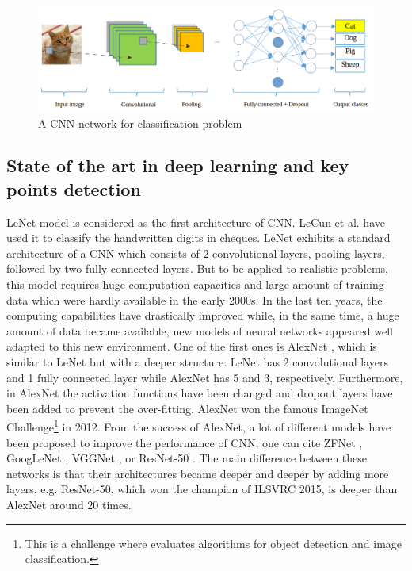 \documentclass[review]{elsarticle}
\begin{document}
\begin{figure}[!h]
	\centering
	\includegraphics[scale=.3]{images/cnn_network_2}
	\caption{A CNN network for classification problem}
	\label{imgcnn_network}
\end{figure}

\subsection{State of the art in deep learning and key points detection}
LeNet \cite{lecun1998gradient} model is considered as the first
architecture of CNN. LeCun et al. \cite{lecun1998gradient} have used
it to classify the handwritten digits in cheques. LeNet exhibits a
standard architecture of a CNN which consists of $2$ convolutional
layers, pooling layers, followed by two fully connected layers. But to
be applied to realistic problems, this model requires huge computation
capacities and large amount of training data which were hardly
available in the early 2000s. In the last ten years, the computing
capabilities have drastically improved while, in the same time, a huge
amount of data became available, new models of neural networks
appeared well adapted to this new environment. One of the first ones
is AlexNet \cite{krizhevsky2012imagenet}, which is similar to LeNet
\cite{lecun1998gradient} but with a deeper structure: LeNet has 2
convolutional layers and 1 fully connected layer while AlexNet has 5
and 3, respectively. Furthermore, in AlexNet the activation functions
have been changed and dropout layers have been added to prevent the
over-fitting. AlexNet won the famous ImageNet Challenge\footnote{This
  is a challenge where evaluates algorithms for object detection and
  image classification.} in 2012. From the success of AlexNet, a lot
of different models have been proposed to improve the performance of
CNN, one can cite ZFNet  \cite{zeiler2014visualizing}, GoogLeNet
\cite{szegedy2015going}, VGGNet \cite{simonyan2014very}, or ResNet-50
\cite{he2016deep}. The main difference between these networks is that
their architectures became deeper and deeper by adding more layers,
e.g. ResNet-50, which won the champion of ILSVRC 2015, is deeper than
AlexNet around $20$ times.
\end{document}
